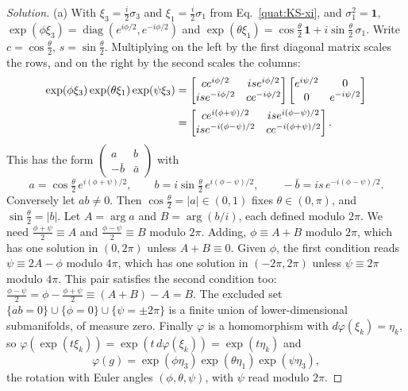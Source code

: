 \begin{proof}[Solution]
(a) With $\xi_3=\frac i2\sigma_3$ and $\xi_1=\frac i2\sigma_1$ from
Eq.~\eqref{quat:KS-xi}, and $\sigma_1^2=\mathbf 1$,
$\exp(\phi\xi_3)=\operatorname{diag}(e^{i\phi/2},e^{-i\phi/2})$ and
$\exp(\theta\xi_1)=\cos\frac\theta2\,\mathbf 1+i\sin\frac\theta2\,\sigma_1$.
Write $c=\cos\frac\theta2$, $s=\sin\frac\theta2$. Multiplying on the left by
the first diagonal matrix scales the rows, and on the right by the second
scales the columns:
\begin{align}
 \exp(\phi\xi_3)\exp(\theta\xi_1)\exp(\psi\xi_3)
 &=\begin{bmatrix}ce^{i\phi/2}&ise^{i\phi/2}\\ ise^{-i\phi/2}&ce^{-i\phi/2}\end{bmatrix}
   \begin{bmatrix}e^{i\psi/2}&0\\0&e^{-i\psi/2}\end{bmatrix}\notag\\
 &=\begin{bmatrix}ce^{i(\phi+\psi)/2}&ise^{i(\phi-\psi)/2}\\
   ise^{-i(\phi-\psi)/2}&ce^{-i(\phi+\psi)/2}\end{bmatrix}.\label{haar:SU2-euler}
\end{align}
This has the form $\left(\begin{smallmatrix}a&b\\-\bar b&\bar a\end{smallmatrix}\right)$
with
\begin{equation}\label{haar:SU2-euler-ab}
 a=\cos\tfrac\theta2\,e^{i(\phi+\psi)/2},\qquad
 b=i\sin\tfrac\theta2\,e^{i(\phi-\psi)/2},\qquad
 -\bar b=is\,e^{-i(\phi-\psi)/2}.
\end{equation}
Conversely let $ab\ne0$. Then $\cos\frac\theta2=|a|\in(0,1)$ fixes
$\theta\in(0,\pi)$, and $\sin\frac\theta2=|b|$. Let $A=\arg a$ and
$B=\arg(b/i)$, each defined modulo $2\pi$. We need
$\frac{\phi+\psi}2\equiv A$ and $\frac{\phi-\psi}2\equiv B$ modulo $2\pi$.
Adding, $\phi\equiv A+B$ modulo $2\pi$, which has one solution in
$(0,2\pi)$ unless $A+B\equiv0$. Given $\phi$, the first condition reads
$\psi\equiv2A-\phi$ modulo $4\pi$, which has one solution in $(-2\pi,2\pi)$
unless $\psi\equiv2\pi$ modulo $4\pi$. This pair satisfies the second
condition too: $\frac{\phi-\psi}2=\phi-\frac{\phi+\psi}2\equiv(A+B)-A=B$.
The excluded set $\{ab=0\}\cup\{\phi=0\}\cup\{\psi=\pm2\pi\}$ is a finite
union of lower-dimensional submanifolds, of measure zero.
Finally $\varphi$ is a homomorphism with $d\varphi(\xi_k)=\eta_k$, so
$\varphi(\exp(t\xi_k))=\exp(t\,d\varphi(\xi_k))=\exp(t\eta_k)$ and
\begin{equation}
 \varphi(g)=\exp(\phi\eta_3)\exp(\theta\eta_1)\exp(\psi\eta_3),
\end{equation}
the rotation with Euler angles $(\phi,\theta,\psi)$, with $\psi$ read modulo
$2\pi$.


\end{proof}
